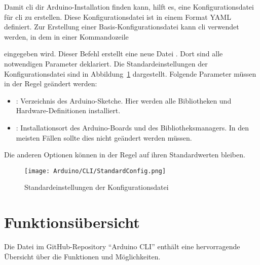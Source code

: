 
Damit \ac{cli} dir Arduino-Installation finden kann, hilft es, eine Konfigurationsdatei für \ac{cli} zu erstellen. Diese Konfigurationsdatei ist in einem Format YAML definiert.
Zur Erstellung einer Basis-Konfigurationsdatei kann \ac{cli}  verwendet werden, in dem in einer Kommandozeile 

\medskip


\medskip

eingegeben wird. Dieser Befehl erstellt eine neue Datei . Dort sind alle notwendigen Parameter deklariert. Die Standardeinstellungen der Konfigurationsdatei sind in Abbildung~\ref{KonfigBild} dargestellt. Folgende Parameter müssen in der Regel geändert werden:

\begin{itemize}
    \item {}: Verzeichnis des Arduino-Sketche. Hier werden alle Bibliotheken und Hardware-Definitionen installiert.
    \item {}:  Installationsort des Arduino-Boards und des Bibliotheksmanagers. In den meisten Fällen sollte dies nicht geändert werden müssen.
\end{itemize}


Die anderen Optionen können in der Regel auf ihren Standardwerten bleiben.


\begin{figure}
    \begin{center}
        \texttt{[image: Arduino/CLI/StandardConfig.png]}
        \caption{Standardeinstellungen der Konfigurationsdatei}
        \label{KonfigBild}
    \end{center}
\end{figure}




\section{Funktionsübersicht}


Die Datei  im GitHub-Repository  ``Arduino CLI'' enthält eine hervorragende Übersicht über die Funktionen und Möglichkeiten.\cite{ArduinoCLIGit:2022} 


